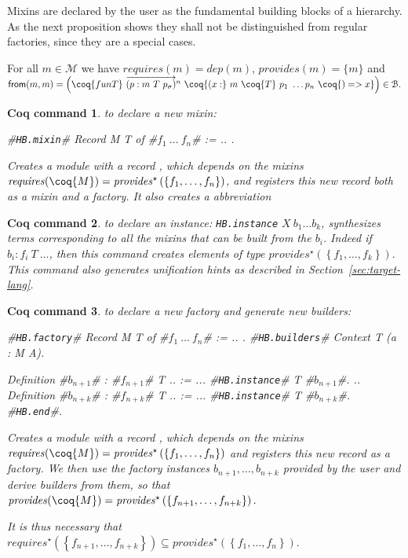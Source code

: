 \documentclass[a4paper,UKenglish,cleveref, autoref]{lipics-v2019}
\newcommand{\mixin}{mixin}
\newcommand{\mixins}{mixins}
\newcommand{\Mixins}{Mixins}
\newcommand{\M}{\ensuremath{\mathcal{M}}}
\newcommand{\factory}{factory}
\newcommand{\factories}{factories}
\newcommand{\phantterm}{abbreviation}
\newcommand{\mixinbuilders}{builders}
\newcommand{\factoryinstances}{factory instances}
\newcommand{\F}{\ensuremath{\mathcal{F}}}
\newcommand{\dep}{\ensuremath{\mathit{dep}}}
\newcommand{\B}{\ensuremath{\mathcal{B}}}
\newcommand{\requires}{\ensuremath{\mathit{requires}}}
\newcommand{\provides}{\ensuremath{\mathit{provides}}}
\newcommand{\from}{\ensuremath{\mathsf{from}}}
\newcommand{\set}[1]{\left\{#1\right\}}
\newcommand{\enum}[2]{\ensuremath{\set{#1,\ldots,#2}}}
\newcommand{\vect}[1]{\overrightarrow{#1}}
\newcommand{\pmp}[1]{\ensuremath{\vect{\left(p : m\ T\ p_\sigma\right)}^{#1}}}
\newcommand{\hbmixin}{{\tt\color{dkgreen}HB.mixin}}
\newcommand{\hbfactory}{{\tt\color{dkgreen}HB.factory}}
\newcommand{\hbinstance}{{\tt\color{dkgreen}HB.instance}}
\newcommand{\hbbuilders}{{\tt\color{dkgreen}HB.builders}}
\newcommand{\hbend}{{\tt\color{dkgreen}HB.end}}
\theoremstyle{implem}
\theoremstyle{implem}
\theoremstyle{command}
\newtheorem*{command}{Coq command}
\begin{document}
\Mixins{} are declared by the user as the fundamental building blocks of
a hierarchy. As the next proposition shows they shall not be distinguished
from regular \factories{}, since they are a special cases.

\begin{proposition}[\( \M{} \subseteq \F{} \)] For all \(m \in \M{}\)
  we have \(\requires{}(m) = \dep{}(m)\), \(\provides{}(m) = \{m\}\)
  and
  \(\from{}(m,m) = \left(\coq{fun T }\ \pmp{n} \ \coq{(x :}\ m\
  \coq{T }\ p_1\ \ldots p_n\ \coq{) => x}\right) \in \B{}.\)
\end{proposition}


\begin{command} to declare a new mixin:
\begin{coqcode}
#\hbmixin{}# Record M T of #$f_1\ \ldots\ f_n$# := { .. }.
\end{coqcode}
  Creates a module  with a record
  \coq{M}, which depends on the \mixins{}
  \(\requires{}(\coq{M}) =
  \provides{}^\star\left(\enum{f_1}{f_n}\right)\), and registers this
  new record both as a \mixin{} and a \factory{}. It also creates a
  \phantterm{} \coq{M.Build.}
\end{command}

\begin{command} to declare an instance: \hbinstance{}
  \(X\ b_1 \ldots b_k\), synthesizes terms corresponding to all the
  \mixins{} that can be built from the $b_i$. Indeed if
  \(b_i : f_i\ T\ \ldots\), then this command creates elements of type
  \(\provides{}^\star\left(\enum{f_1}{f_k}\right).\) This command also
  generates unification hints as described in
  Section~\ref{sec:target-lang}.
\end{command}

\begin{command} to declare a new \factory{} and generate new \mixinbuilders:
\begin{coqcode}
#\hbfactory{}# Record M T of #$f_1\ \ldots\ f_n$# := { .. }.
#\hbbuilders{}# Context T (a : M A).

  Definition #$b_{n+1}$# : #$f_{n+1}$# T .. := ...
  #\hbinstance{}# T #$b_{n+1}$#.
  ..
  Definition #$b_{n+k}$# : #$f_{n+k}$# T .. := ...
  #\hbinstance{}# T #$b_{n+k}$#.
#\hbend{}#.
\end{coqcode}
  Creates a module  with a record
  \coq{M}, which depends on the mixins
  \(\requires{}(\coq{M}) =
  \provides{}^\star\left(\enum{f_1}{f_n}\right)\) and registers this
  new record as a factory. We then use the \factoryinstances{}
  \(b_{n+1}, \ldots, b_{n+k}\) provided by the user and derive
  \mixinbuilders{} from them, so that
  \(\provides{}(\coq{M}) = \provides{}^\star\left(\enum{f_{n+1}}{f_{n+k}}\right).\)

  It is thus necessary that
  \(\requires{}^\star\left(\enum{f_{n+1}}{f_{n+k}}\right) \subseteq
  \provides{}^\star\left(\enum{f_1}{f_n}\right).\)
\end{command}
\end{document}
